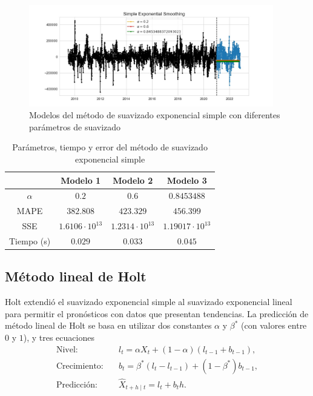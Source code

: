 \documentclass[12pt,twoside]{article}
\begin{document}
\begin{figure}[h]
    \centering
    \includegraphics[width = 0.95\textwidth]{imagenes/SimpleES2.jpg}
    \caption{Modelos del método de suavizado exponencial simple con diferentes parámetros de suavizado}\label{fig:SimpleES2}
\end{figure}

\begin{table}[h] 
\centering
\begin{tabular}{cccc} \hline
     & Modelo 1 & Modelo 2 & Modelo 3  \\ \hline
    $\alpha$ &  $0.2$ &   $0.6$ &   $0.8453488$ \\ 
      MAPE & $382.808$	 &   $423.329$ &  $456.399$ \\
      SSE & $1.6106\cdot 10^{13}$ & $1.2314\cdot 10^{13}$ & $1.19017\cdot 10^{13}$ \\
      Tiempo (s) & $0.029$ &   $0.033$ &  $0.045$ \\ \hline
\end{tabular}
\caption{Parámetros, tiempo y error del método de suavizado exponencial simple} \label{tab:simple_exp}
\end{table}



\newpage
\subsection{Método lineal de Holt}
Holt extendió el suavizado exponencial simple al suavizado exponencial lineal para permitir el pronósticos con datos que presentan tendencias. La predicción de método lineal de Holt se basa en utilizar dos constantes $\alpha$ y $\beta^*$ (con valores entre $0$ y $1$), y tres ecuaciones
\begin{align}
    \text{Nivel:} \quad& l_t = \alpha X_t + (1-\alpha)(l_{t-1} + b_{t-1}),\label{eq:Holt:nivel}\\
    \text{Crecimiento:} \quad& b_t = \beta^*(l_t - l_{t-1}) + (1-\beta^*)b_{t-1},\label{eq:Holt:crec}\\
    \text{Predicción:} \quad& \hat{X}_{t+h \mid t} = l_t + b_th.\label{eq:Holt:pred}
\end{align}
\end{document}
